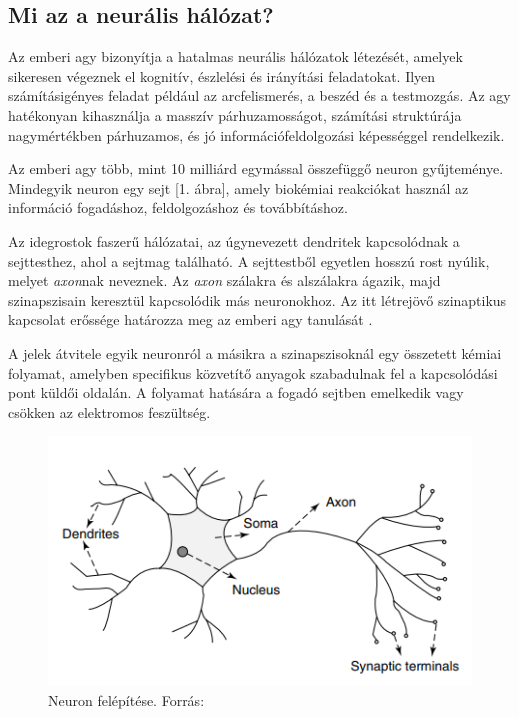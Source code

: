 \documentclass[12pt,a4]{article}
\begin{document}
	\subsection{Mi az a neurális hálózat?}
	\label{NN}
	Az emberi agy bizonyítja a hatalmas neurális hálózatok \cite{ann} létezését, amelyek sikeresen végeznek el kognitív, észlelési és irányítási feladatokat. Ilyen számításigényes feladat például az arcfelismerés, a beszéd és a testmozgás. Az agy hatékonyan kihasználja a masszív párhuzamosságot, számítási struktúrája nagymértékben párhuzamos, és jó információfeldolgozási képességgel rendelkezik.
	
	Az emberi agy több, mint 10 milliárd egymással összefüggő neuron gyűjteménye. Mindegyik neuron egy sejt [1. ábra], amely biokémiai reakciókat használ az információ fogadáshoz, feldolgozáshoz és továbbításhoz.
	
	Az idegrostok faszerű hálózatai, az úgynevezett dendritek kapcsolódnak a sejttesthez, ahol a sejtmag található. A sejttestből egyetlen hosszú rost nyúlik, melyet \textit{axon}nak neveznek. Az \textit{axon} szálakra és alszálakra ágazik, majd szinapszisain keresztül kapcsolódik más neuronokhoz. Az itt létrejövő szinaptikus kapcsolat erőssége határozza meg az emberi agy tanulását\cite{ann} .
	
	A jelek átvitele egyik neuronról a másikra a szinapszisoknál egy összetett kémiai folyamat, amelyben specifikus közvetítő anyagok szabadulnak fel a kapcsolódási pont küldői oldalán. A folyamat hatására a fogadó sejtben emelkedik vagy csökken az elektromos feszültség\cite{ann}.
	\begin{figure}[h]	
		\centering
		\includegraphics[width=1\linewidth]{neuron1}
		\caption{Neuron felépítése. 
			Forrás:\cite{ann}}
	\end{figure}
	\newpage
\end{document}
